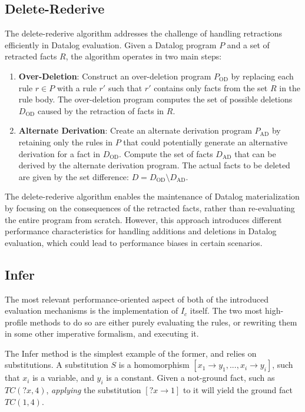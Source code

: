 \documentclass[sigconf,screen,review,natbib]{acmart}
\theoremstyle{definition}
\begin{document}
\subsection{Delete-Rederive}

The delete-rederive algorithm \cite{dred} addresses the challenge of handling retractions efficiently in Datalog evaluation. Given a Datalog program $P$ and a set of retracted facts $R$, the algorithm operates in two main steps:

\begin{enumerate}
	\item \textbf{Over-Deletion}: Construct an over-deletion program $P_{\text{OD}}$ by replacing each rule $r \in P$ with a rule $r'$ such that $r'$ contains only facts from the set $R$ in the rule body. The over-deletion program computes the set of possible deletions $D_{\text{OD}}$ caused by the retraction of facts in $R$.

	\item \textbf{Alternate Derivation}: Create an alternate derivation program $P_{\text{AD}}$ by retaining only the rules in $P$ that could potentially generate an alternative derivation for a fact in $D_{\text{OD}}$. Compute the set of facts $D_{\text{AD}}$ that can be derived by the alternate derivation program. The actual facts to be deleted are given by the set difference: $D = D_{\text{OD}} \setminus D_{\text{AD}}$.
\end{enumerate}

The delete-rederive algorithm enables the maintenance of Datalog materialization by focusing on the consequences of the retracted facts, rather than re-evaluating the entire program from scratch. However, this approach introduces different performance characteristics for handling additions and deletions in Datalog evaluation, which could lead to performance biases in certain scenarios.

\subsection{Infer}
The most relevant performance-oriented aspect of both of the introduced evaluation mechanisms is the implementation of $I_c$ itself. The two
most high-profile methods to do so are either purely evaluating the rules, or rewriting them in some other imperative formalism, and executing it.

The Infer\cite{datalog} method is the simplest example of the former, and relies on substitutions. A substitution $S$ is a homomorphism
$[x_1 \rightarrow y_1, ..., x_i \rightarrow y_i]$, such that $x_i$ is a variable, and $y_i$ is a constant. Given a not-ground fact,
such as $TC(?x, 4)$, \textit{applying} the substitution $[?x \rightarrow 1]$ to it will yield the ground fact $TC(1, 4)$.
\end{document}
